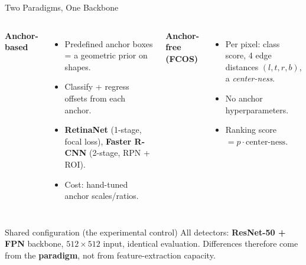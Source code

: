 \documentclass[aspectratio=169,11pt]{beamer}
\newcommand{\hl}[1]{\textcolor{polimi}{\textbf{#1}}}
\begin{document}
\begin{frame}{Two Paradigms, One Backbone}
  \small
  \begin{columns}[T]
      \textbf{\textcolor{retinaorange}{Anchor-based}}
      \begin{itemize}\small
        \item Predefined anchor boxes = a geometric prior on shapes.
        \item Classify + regress offsets from each anchor.
        \item \textbf{RetinaNet} (1-stage, focal loss), \textbf{Faster R-CNN} (2-stage, RPN + ROI).
        \item Cost: hand-tuned anchor scales/ratios.
      \end{itemize}
      \textbf{\textcolor{fcosblue}{Anchor-free (FCOS)}}
      \begin{itemize}\small
        \item Per pixel: class score, 4 edge distances $(l,t,r,b)$, a \emph{center-ness}.
        \item No anchor hyperparameters.
        \item Ranking score $= p \cdot \text{center-ness}$.
      \end{itemize}
  \end{columns}
  \vspace{0.6em}
  \begin{block}{\small Shared configuration (the experimental control)}
    \small All detectors: \hl{ResNet-50 + FPN} backbone, $512\times512$ input, identical evaluation.
    Differences therefore come from the \hl{paradigm}, not from feature-extraction capacity.
  \end{block}
\end{frame}
\end{document}
